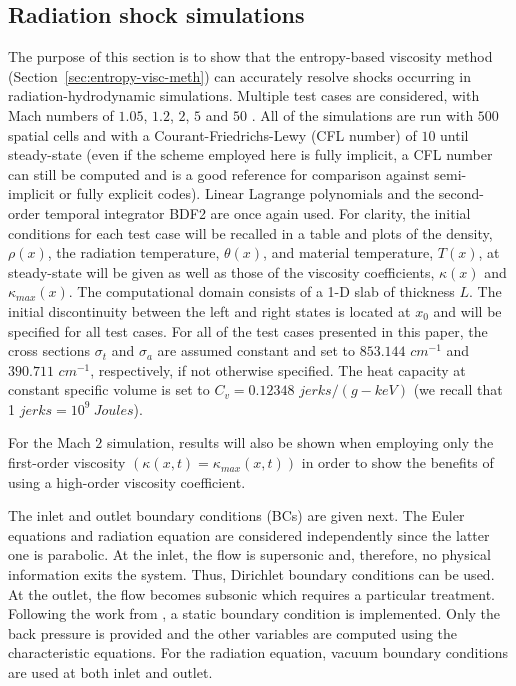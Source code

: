 \documentclass[review]{elsarticle}
\newcommand{\sect}[1]{Section~\ref{#1}}                     %
\begin{document}
\subsection{Radiation shock simulations}
\label{sec:simulations}

The purpose of this section is to show that the entropy-based viscosity method (\sect{sec:entropy-visc-meth}) can accurately resolve shocks occurring in radiation-hydrodynamic simulations. Multiple test cases are considered, with Mach numbers of $1.05$, $1.2$, $2$, $5$ and $50$ \cite{LowrieEdwards}. All of the simulations are run with $500$ spatial cells and with a Courant-Friedrichs-Lewy (CFL number) of $10$ until steady-state (even if the scheme employed here is fully implicit, a CFL number can still be computed and is a good reference for comparison against semi-implicit or fully explicit codes). Linear Lagrange polynomials and the second-order temporal integrator BDF2 are once again used. For clarity, the initial conditions for each test case will be recalled in a table and plots of the density, $\rho (x)$, the radiation temperature, $\theta (x)$, and material temperature, $T(x)$,  at steady-state will be given as well as those of the viscosity coefficients, $\kappa(x)$ and $\kappa_{max}(x)$. The computational domain consists of a 1-D slab of thickness $L$. The initial discontinuity between the left and right states is located at $x_0$ and will be specified for all test cases. For all of the test cases presented in this paper, the cross sections $\sigma_t$ and $\sigma_a$ are assumed constant and set to $853.144$ $cm^{-1}$ and $390.711$ $cm^{-1}$, respectively, if not otherwise specified. The heat capacity at constant specific volume is set to $C_v = 0.12348$ $jerks/(g-keV)$ (we recall that 1 $jerks = 10^9\ Joules$).

For the Mach $2$ simulation, results will also be shown when employing only the first-order viscosity $(\kappa(x,t) = \kappa_{max}(x,t))$ in order to show the benefits of using a high-order viscosity coefficient. 

The inlet and outlet boundary conditions (BCs) are given next. The Euler equations and radiation equation are considered independently since the latter one is parabolic. At the inlet, the flow is supersonic and, therefore, no physical information exits the system. Thus, Dirichlet boundary conditions can be used. At the outlet, the flow becomes subsonic which requires a particular treatment. Following the work from \cite{SEM}, a static boundary condition is implemented. Only the back pressure is provided and the other variables are computed using the characteristic equations. For the radiation equation, vacuum boundary conditions are used at both inlet and outlet.
\end{document}
